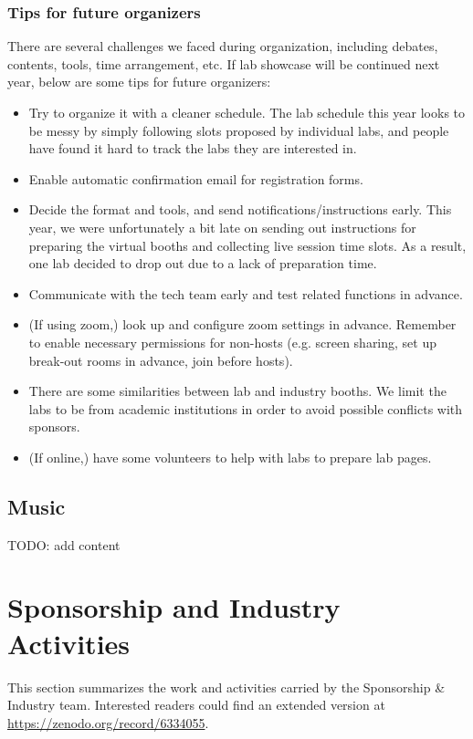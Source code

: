 \documentclass[%
10pt,								%
]
{scrartcl}
\begin{document}
        \subsubsection{Tips for future organizers}
            There are several challenges we faced during organization, including debates, contents, tools, time arrangement, etc. If lab showcase will be continued next year, below are some tips for future organizers:
            \begin{itemize}
                \item Try to organize it with a cleaner schedule. The lab schedule this year looks to be messy by simply following slots proposed by individual labs, and people have found it hard to track the labs they are interested in.
                \item Enable automatic confirmation email for registration forms.
                \item Decide the format and tools, and send notifications/instructions early. This year, we were unfortunately a bit late on sending out instructions for preparing the virtual booths and collecting live session time slots. As a result, one lab decided to drop out due to a lack of preparation time.
                \item Communicate with the tech team early and test related functions in advance.
                \item (If using zoom,) look up and configure zoom settings in advance. Remember to enable necessary permissions for non-hosts (e.g. screen sharing, set up break-out rooms in advance, join before hosts).
                \item There are some similarities between lab and industry booths. We limit the labs to be from academic institutions in order to avoid possible conflicts with sponsors.
                \item (If online,) have some volunteers to help with labs to prepare lab pages.
            \end{itemize}
    
    
    \subsection{Music}
        TODO: add content
        
        
\section{Sponsorship and Industry Activities}
    This section summarizes the work and activities carried by the Sponsorship \& Industry team. Interested readers could find an extended version at \href{https://zenodo.org/record/6334055}{https://zenodo.org/record/6334055}.
    
\end{document}
